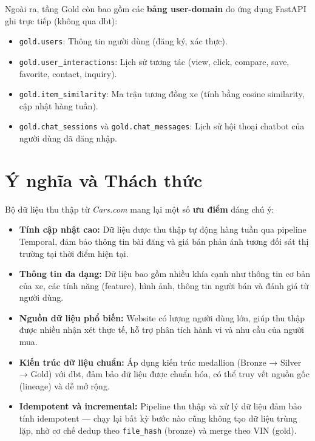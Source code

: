 Ngoài ra, tầng Gold còn bao gồm các \textbf{bảng user-domain} do ứng dụng FastAPI ghi trực tiếp (không qua dbt):
\begin{itemize}
    \item \texttt{gold.users}: Thông tin người dùng (đăng ký, xác thực).
    \item \texttt{gold.user\_interactions}: Lịch sử tương tác (view, click, compare, save, favorite, contact, inquiry).
    \item \texttt{gold.item\_similarity}: Ma trận tương đồng xe (tính bằng cosine similarity, cập nhật hàng tuần).
    \item \texttt{gold.chat\_sessions} và \texttt{gold.chat\_messages}: Lịch sử hội thoại chatbot của người dùng đã đăng nhập.
\end{itemize}

\section{Ý nghĩa và Thách thức}

Bộ dữ liệu thu thập từ \textit{Cars.com} mang lại một số \textbf{ưu điểm} đáng chú ý:
\begin{itemize}
    \item \textbf{Tính cập nhật cao:} Dữ liệu được thu thập tự động hàng tuần qua pipeline Temporal, đảm bảo thông tin bài đăng và giá bán phản ánh tương đối sát thị trường tại thời điểm hiện tại.
    \item \textbf{Thông tin đa dạng:} Dữ liệu bao gồm nhiều khía cạnh như thông tin cơ bản của xe, các tính năng (feature), hình ảnh, thông tin người bán và đánh giá từ người dùng.
    \item \textbf{Nguồn dữ liệu phổ biến:} Website có lượng người dùng lớn, giúp thu thập được nhiều nhận xét thực tế, hỗ trợ phân tích hành vi và nhu cầu của người mua.
    \item \textbf{Kiến trúc dữ liệu chuẩn:} Áp dụng kiến trúc medallion (Bronze → Silver → Gold) với dbt, đảm bảo dữ liệu được chuẩn hóa, có thể truy vết nguồn gốc (lineage) và dễ mở rộng.
    \item \textbf{Idempotent và incremental:} Pipeline thu thập và xử lý dữ liệu đảm bảo tính idempotent — chạy lại bất kỳ bước nào cũng không tạo dữ liệu trùng lặp, nhờ cơ chế dedup theo \texttt{file\_hash} (bronze) và merge theo VIN (gold).
\end{itemize}

